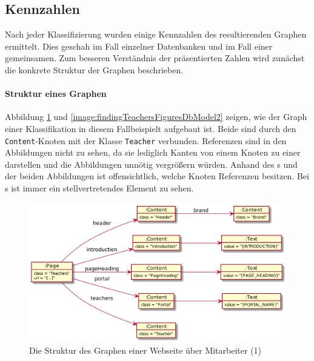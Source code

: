 \subsection{Kennzahlen}
    Nach jeder Klassifizierung wurden einige Kennzahlen des
    resultierenden Graphen ermittelt.
    Dies geschah im Fall einzelner Datenbanken und im Fall
    einer gemeinsamen.
    Zum besseren Verständnis der präsentierten Zahlen wird
    zunächst die konkrete Struktur der Graphen beschrieben.

    \paragraph{Struktur eines Graphen}
    Abbildung \ref{image:findingTeachersFiguresDbModel1}
    und \ref{image:findingTeachersFiguresDbModel2} zeigen,
    wie der Graph einer Klassifikation in diesem Fallbeispielt aufgebaut ist.
    Beide sind durch den \texttt{Content}-Knoten mit der Klasse \texttt{Teacher} verbunden.
    Referenzen sind in den Abbildungen nicht zu sehen,
    da sie lediglich Kanten von einem Knoten zu einer {\resource} darstellen
    und die Abbildungen unnötig vergrößern würden.
    Anhand des {\classificationModel}s und der beiden Abbildungen ist
    offensichtlich, welche Knoten Referenzen besitzen.
    Bei {\collectionFeature}s ist immer ein stellvertretendes Element zu sehen.

    \begin{figure}[htb]
        \centering
        \includegraphics[scale=\imageScalingFactor]{../resources/findings/case-study-1/dbmodel/dbmodel1.png}
        \caption{Die Struktur des Graphen einer Webseite über Mitarbeiter (1)}
        \label{image:findingTeachersFiguresDbModel1}
    \end{figure}

